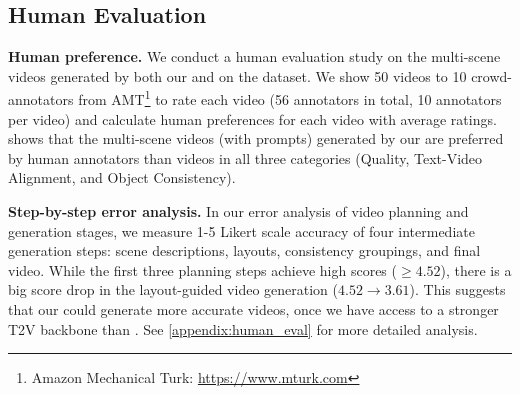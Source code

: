 \documentclass{article}
\begin{document}
 




\subsection{Human Evaluation}
\label{sec:human_evaluation}

\begin{table}
\vspace{-30pt}
\centering
{}
\caption{Human preference on multi-scene videos generated with
\corefdata{} prompts.
}
\label{table:human_eval}
\end{table}



\textbf{Human preference.}
We conduct a human evaluation study on the multi-scene videos generated by both our \method{} and \modelscope{} on the \corefdata{} dataset.
We show 50 videos to 10 crowd-annotators from AMT\footnote{Amazon Mechanical Turk: \url{https://www.mturk.com}} to rate each video (56 annotators in total, 10 annotators per video) and calculate human preferences for each video with average ratings.
 shows that the multi-scene videos (with \corefdata{} prompts) generated by our \method{} are preferred
by human annotators
than \modelscope{} videos in 
all three categories (Quality, Text-Video Alignment, and Object Consistency).



\textbf{Step-by-step error analysis.}
In our error analysis of video planning and generation stages,
we measure 1-5 Likert scale accuracy of four intermediate generation steps: scene descriptions, layouts, consistency groupings, and final video.
While the first three planning steps achieve high scores ($\ge 4.52$),
there is a big score drop in the layout-guided video generation ($4.52\xrightarrow{}3.61$). 
This suggests that our \method{} could generate more accurate videos,
once we have access to a stronger T2V backbone than \modelscope{}.
See \cref{appendix:human_eval} for more detailed analysis.
\end{document}
